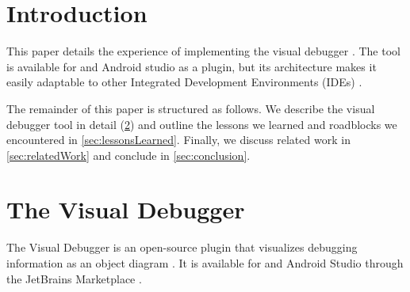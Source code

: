 \documentclass[sigconf]{acmart}
\begin{document}

\maketitle

\section{Introduction}
This paper details the experience of implementing the visual debugger \cite{krauterVisualDebuggerTool2022}.
The tool is available for \intellij and Android studio as a plugin, but its architecture makes it easily adaptable to other Integrated Development Environments (IDEs) \cite{timkrauterVisualDebuggerIntelliJ2023}.


The remainder of this paper is structured as follows.
We describe the visual debugger tool in detail (\cref{sec:visualDebugger}) and outline the lessons we learned and roadblocks we encountered in \cref{sec:lessonsLearned}.
Finally, we discuss related work in \cref{sec:relatedWork} and conclude in \cref{sec:conclusion}.


\section{The Visual Debugger} \label{sec:visualDebugger}
The Visual Debugger is an open-source \intellij plugin that visualizes debugging information as an object diagram \cite{timkrauterVisualDebuggerTool2023}.
It is available for \intellij and Android Studio through the JetBrains Marketplace \cite{timkrauterVisualDebuggerIntelliJ2023}.

\end{document}
